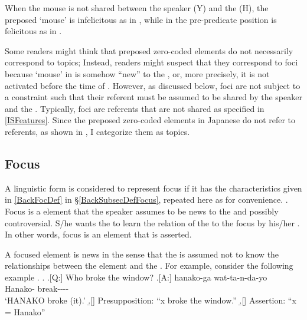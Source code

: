 When the mouse is not shared between the speaker (Y) and the  (H),
the preposed  `mouse' is infelicitous as in \Last[Y],
while  in the pre-predicate position is felicitous as in \Last[Y$^{\prime}$].

%

Some readers might think that preposed zero-coded elements do not necessarily correspond to topics;
Instead, readers might suspect that they correspond to foci
because  `mouse' in \LLast is somehow ``new'' to the ,
or, more precisely,
it is not activated before the time of  \LLast[Y].
However, as discussed below,
foci are not subject to a constraint such that their referent must be assumed to be shared by the speaker and the .
Typically, foci are  referents that are not shared as specified in \ref{ISFeatures}.
Since the preposed zero-coded elements in Japanese do not refer to  referents, as shown in \Last,
I categorize them as topics.

\subsection{Focus}\label{FrameworkFocus}

A linguistic form is considered to represent focus if it has the characteristics given in \ref{BackFocDef} in \S \ref{BackSubsecDefFocus},
repeated here as \Next for convenience.
%
\ex. Focus is a  element that the speaker assumes to be news to the  and possibly controversial.
S/he wants the  to learn the relation of the  to the focus by his/her .
In other words, focus is an element that is asserted.
\label{FocDef}

A focused  element is news in the sense that
the  is assumed not to know the relationships between the element and the .
For example,
consider the following example \Next.
\ex. \a.[Q:] Who broke the window?
	\bg.[A:] hanako-ga wat-ta-n-da-yo \\
		Hanako- break---- \\
		`HANAKO broke (it).'
	\b.[] Presupposition: ``x broke the window.''
	\b.[] Assertion: ``x = Hanako''

